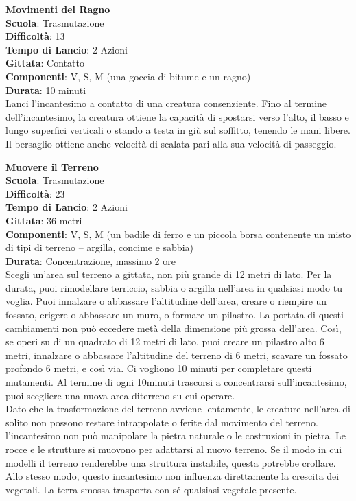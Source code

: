 \begin{multicols}{2}
\medskip\textbf{Movimenti del Ragno}\\
\textbf{Scuola}: Trasmutazione\\
\textbf{Difficoltà}:  13\\
\textbf{Tempo di Lancio}: 2 Azioni\\
\textbf{Gittata}: Contatto\\
\textbf{Componenti}: V, S, M (una goccia di bitume e un ragno)\\
\textbf{Durata}: 10 minuti \\
Lanci l'incantesimo a contatto di una creatura consenziente. Fino al termine dell'incantesimo, la creatura ottiene la capacità di spostarsi verso l’alto, il basso e lungo superfici verticali o stando a testa in giù sul soffitto, tenendo le mani libere. Il bersaglio ottiene anche velocità di scalata pari alla sua velocità di passeggio.

\medskip\textbf{Muovere il Terreno}\\
\textbf{Scuola}: Trasmutazione\\
\textbf{Difficoltà}:  23\\
\textbf{Tempo di Lancio}: 2 Azioni\\
\textbf{Gittata}: 36 metri\\
\textbf{Componenti}: V, S, M (un badile di ferro e un piccola borsa contenente un misto di tipi di terreno – argilla, concime e sabbia)\\
\textbf{Durata}: Concentrazione, massimo 2 ore\\
Scegli un'area sul terreno a gittata, non più grande di 12 metri di lato. Per la durata, puoi rimodellare terriccio, sabbia o argilla nell'area in qualsiasi modo tu voglia. Puoi innalzare o abbassare l’altitudine dell'area, creare o riempire un fossato, erigere o abbassare un muro, o formare un pilastro. La portata di questi cambiamenti non può eccedere metà della dimensione più grossa dell'area. Così, se operi su di un quadrato di 12 metri di lato, puoi creare un pilastro alto 6 metri, innalzare o abbassare l’altitudine del terreno di 6 metri, scavare un fossato profondo 6 metri, e così via. Ci vogliono 10 minuti per completare questi mutamenti. Al termine di ogni 10minuti trascorsi a concentrarsi  sull'incantesimo, puoi scegliere una nuova area diterreno su cui operare.\\
Dato che la trasformazione del terreno avviene lentamente, le creature nell'area di solito non possono restare intrappolate o ferite dal movimento del terreno. l'incantesimo non può manipolare la pietra naturale o le costruzioni in pietra. Le rocce e le strutture si muovono per adattarsi al nuovo terreno. Se il modo in cui modelli il terreno renderebbe una struttura instabile, questa potrebbe crollare. Allo stesso modo, questo incantesimo non influenza direttamente la crescita dei vegetali. La terra smossa trasporta con sé qualsiasi vegetale presente.


\end{multicols}
